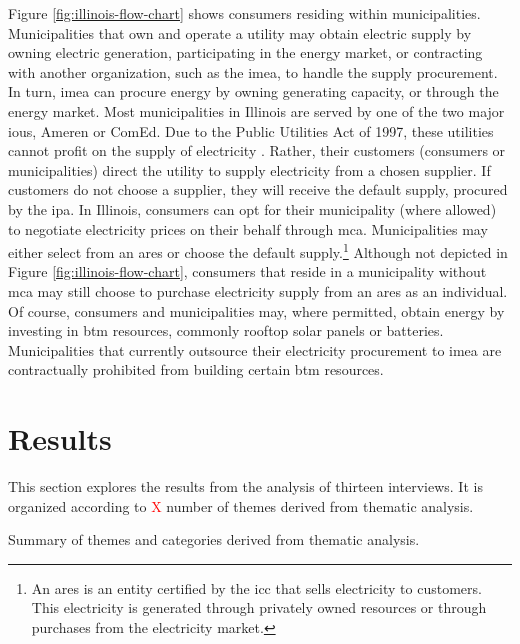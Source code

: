 Figure \ref{fig:illinois-flow-chart} shows consumers residing within
municipalities. Municipalities that own and operate a utility may obtain
electric supply by owning electric generation, participating in the energy
market, or contracting with another organization, such as the \ac{imea}, to
handle the supply procurement. In turn, \ac{imea} can procure energy by owning
generating capacity, or through the energy market. Most municipalities in
Illinois are served by one of the two major \acp{iou}, Ameren or ComEd. Due to
the Public Utilities Act of 1997, these utilities cannot profit on the supply of
electricity \cite{illinois_90th_general_assembly_electric_1997}. Rather, their
customers (consumers or municipalities) direct the utility to supply electricity
from a chosen supplier. If customers do not choose a supplier, they will receive
the default supply, procured by the \ac{ipa}. In Illinois, consumers can opt for
their municipality (where allowed) to negotiate electricity prices on their
behalf through \ac{mca}. Municipalities may either select from an \ac{ares} or
choose the default supply.\footnote{An \ac{ares} is an entity certified by the
\ac{icc} that sells electricity to customers. This electricity is generated
through privately owned resources or through purchases from the electricity
market.} Although not depicted in Figure \ref{fig:illinois-flow-chart},
consumers that reside in a municipality without \ac{mca} may still choose to
purchase electricity supply from an \ac{ares} as an individual. Of course,
consumers and municipalities may, where permitted, obtain energy by investing in
\ac{btm} resources, commonly rooftop solar panels or batteries. Municipalities
that currently outsource their electricity procurement to \ac{imea} are
contractually prohibited from building certain \ac{btm} resources.

\section{Results}
This section explores the results from the analysis of thirteen interviews. It is organized
according to \textcolor{red}{X} number of themes derived from thematic analysis.

\begin{table}[ht!]
    \centering
    \caption{Summary of themes and categories derived from thematic analysis.}
    \label{tab:themes}
    
\end{table}

